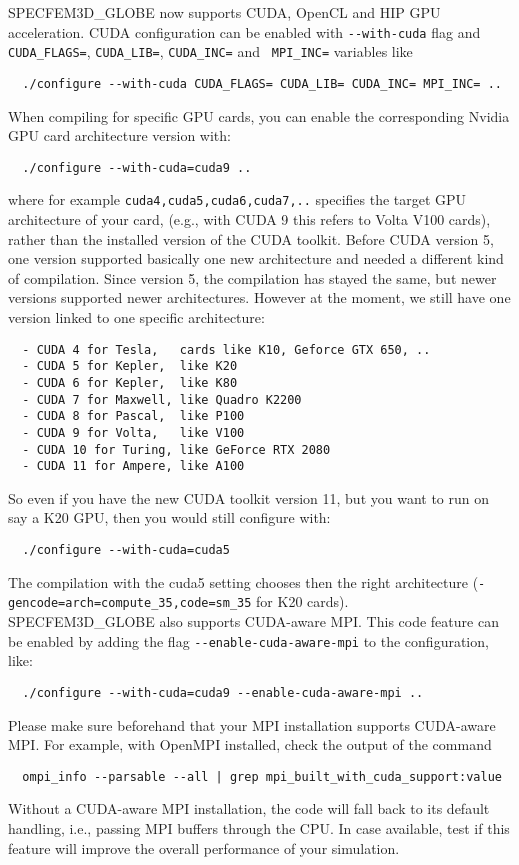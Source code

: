 \noindent
SPECFEM3D\_GLOBE now supports CUDA, OpenCL and HIP GPU acceleration.
CUDA configuration can be enabled with \texttt{-{}-with-cuda} flag and
\texttt{CUDA\_FLAGS=}, \texttt{CUDA\_LIB=}, \texttt{CUDA\_INC=}
and \texttt{ MPI\_INC=} variables like
{\small
\begin{verbatim}
  ./configure --with-cuda CUDA_FLAGS= CUDA_LIB= CUDA_INC= MPI_INC= ..
\end{verbatim}
}
\noindent
When compiling for specific GPU cards, you can enable the corresponding Nvidia GPU card architecture version with:
{\small
\begin{verbatim}
  ./configure --with-cuda=cuda9 ..
\end{verbatim}
}
\noindent
where for example \texttt{cuda4,cuda5,cuda6,cuda7,..} specifies the target GPU architecture of your card,
(e.g., with CUDA 9 this refers to Volta V100 cards), rather than the installed version of the CUDA toolkit.
Before CUDA version 5, one version supported basically one new architecture and needed a different kind of compilation.
Since version 5, the compilation has stayed the same, but newer versions supported newer architectures.
However at the moment, we still have one version linked to one specific architecture:
{\small
\begin{verbatim}
  - CUDA 4 for Tesla,   cards like K10, Geforce GTX 650, ..
  - CUDA 5 for Kepler,  like K20
  - CUDA 6 for Kepler,  like K80
  - CUDA 7 for Maxwell, like Quadro K2200
  - CUDA 8 for Pascal,  like P100
  - CUDA 9 for Volta,   like V100
  - CUDA 10 for Turing, like GeForce RTX 2080
  - CUDA 11 for Ampere, like A100
\end{verbatim}
}
\noindent
So even if you have the new CUDA toolkit version 11, but you want to run on say a K20 GPU, then you would still configure with:
{\small
\begin{verbatim}
  ./configure --with-cuda=cuda5
\end{verbatim}
}
\noindent
The compilation with the cuda5 setting chooses then the right architecture (\texttt{-gencode=arch=compute\_35,code=sm\_35} for K20 cards).\\


SPECFEM3D\_GLOBE also supports CUDA-aware MPI. This code feature can be enabled by adding the flag \texttt{-{}-enable-cuda-aware-mpi} to
the configuration, like:
{\small
\begin{verbatim}
  ./configure --with-cuda=cuda9 --enable-cuda-aware-mpi ..
\end{verbatim}
}
\noindent
Please make sure beforehand that your MPI installation supports CUDA-aware MPI.
For example, with OpenMPI installed, check the output of the command
{\small
\begin{verbatim}
  ompi_info --parsable --all | grep mpi_built_with_cuda_support:value
\end{verbatim}
}
\noindent
Without a CUDA-aware MPI installation, the code will fall back to its default handling, i.e., passing MPI buffers through the CPU.
In case available, test if this feature will improve the overall performance of your simulation.\\



